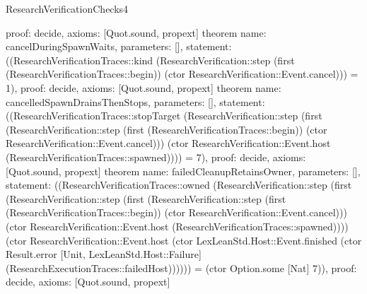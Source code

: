 \begin{lexlean}{ResearchVerificationChecks4}
\begin{semanticmodule}
{  proof: decide{},
  axioms: [Quot.sound, propext]
}
theorem{
  name: cancelDuringSpawnWaits,
  parameters: [],
  statement: ((ResearchVerificationTraces::kind (ResearchVerification::step (first (ResearchVerificationTraces::begin)) (ctor ResearchVerification::Event.cancel))) = 1),
  proof: decide{},
  axioms: [Quot.sound, propext]
}
theorem{
  name: cancelledSpawnDrainsThenStops,
  parameters: [],
  statement: ((ResearchVerificationTraces::stopTarget (ResearchVerification::step (first (ResearchVerification::step (first (ResearchVerificationTraces::begin)) (ctor ResearchVerification::Event.cancel))) (ctor ResearchVerification::Event.host (ResearchVerificationTraces::spawned)))) = 7),
  proof: decide{},
  axioms: [Quot.sound, propext]
}
theorem{
  name: failedCleanupRetainsOwner,
  parameters: [],
  statement: ((ResearchVerificationTraces::owned (ResearchVerification::step (first (ResearchVerification::step (first (ResearchVerification::step (first (ResearchVerificationTraces::begin)) (ctor ResearchVerification::Event.cancel))) (ctor ResearchVerification::Event.host (ResearchVerificationTraces::spawned)))) (ctor ResearchVerification::Event.host (ctor LexLeanStd.Host::Event.finished (ctor Result.error [Unit, LexLeanStd.Host::Failure] (ResearchExecutionTraces::failedHost)))))) = (ctor Option.some [Nat] 7)),
  proof: decide{},
  axioms: [Quot.sound, propext]
}
\end{semanticmodule}
\end{lexlean}
